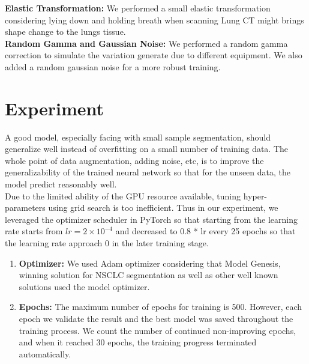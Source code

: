 \textbf{Elastic Transformation:} We performed a small elastic transformation considering lying down and holding breath when scanning Lung CT might brings shape change to the lungs tissue.\\

\textbf{Random Gamma and Gaussian Noise:} We performed a random gamma correction to simulate the variation generate due to different equipment. We also added a random gaussian noise for a more robust training.






\newpage
\section{Experiment}
A good model, especially facing with small sample segmentation, should generalize well instead of overfitting on a small number of training data. The whole point of data augmentation, adding noise, etc, is to improve the generalizability of the trained neural network so that for the unseen data, the model predict reasonably well.\\

Due to the limited ability of the GPU resource available, tuning hyper-parameters using grid search is too inefficient. Thus in our experiment, we leveraged the optimizer scheduler in PyTorch so that starting from the learning rate starts from $lr=2\times10^{-4}$ and decreased to 0.8 * lr every 25 epochs so that the learning rate approach 0 in the later training stage.  
\begin{enumerate}
 	\item \textbf{Optimizer:} We used Adam optimizer considering that Model Genesis, winning solution for NSCLC segmentation as well as other well known solutions used the model optimizer.
	\item \textbf{Epochs:} The maximum number of epochs for training is 500. However, each epoch we validate the result and the best model was saved throughout the training process. We count the number of continued non-improving epochs, and when it reached 30 epochs, the training progress terminated automatically.
	\end{enumerate}


